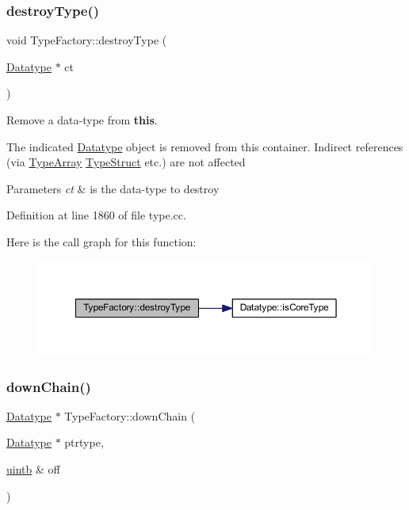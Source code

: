 \subsubsection{\texorpdfstring{destroyType()}{destroyType()}}
{\footnotesize\ttfamily void Type\+Factory\+::destroy\+Type (\begin{DoxyParamCaption}\item[{\mbox{\hyperlink{class_datatype}{Datatype}} $\ast$}]{ct }\end{DoxyParamCaption})}



Remove a data-\/type from {\bfseries{this}}. 

The indicated \mbox{\hyperlink{class_datatype}{Datatype}} object is removed from this container. Indirect references (via \mbox{\hyperlink{class_type_array}{Type\+Array}} \mbox{\hyperlink{class_type_struct}{Type\+Struct}} etc.) are not affected 
\begin{DoxyParams}{Parameters}
{\em ct} & is the data-\/type to destroy \\
\hline
\end{DoxyParams}


Definition at line 1860 of file type.\+cc.

Here is the call graph for this function\+:
\nopagebreak
\begin{figure}[H]
\begin{center}
\leavevmode
\includegraphics[width=350pt]{class_type_factory_ab4edd4fa31629380ec4124c840022f5a_cgraph}
\end{center}
\end{figure}
\mbox{\label{class_type_factory_a979852b4d0b186f833d16d4638fe6f08}} 
\subsubsection{\texorpdfstring{downChain()}{downChain()}}
{\footnotesize\ttfamily \mbox{\hyperlink{class_datatype}{Datatype}} $\ast$ Type\+Factory\+::down\+Chain (\begin{DoxyParamCaption}\item[{\mbox{\hyperlink{class_datatype}{Datatype}} $\ast$}]{ptrtype,  }\item[{\mbox{\hyperlink{types_8h_a2db313c5d32a12b01d26ac9b3bca178f}{uintb}} \&}]{off }\end{DoxyParamCaption})}




